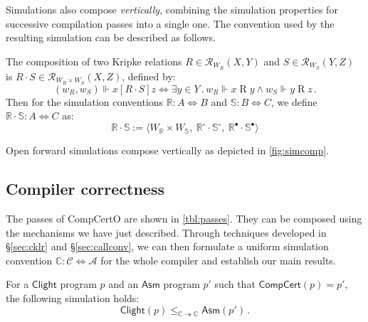 \documentclass[sigplan,screen,review]{acmart}
\newcommand{\kw}[1]{\ensuremath{ \mathsf{#1} }}
\newcommand{\ifr}[1]{\mathrel{[{#1}]}}
\newcommand{\que}{\circ}
\newcommand{\ans}{\bullet}
\begin{document}
Simulations also compose \emph{vertically},
combining the
simulation properties for successive compilation passes
into a single one.
The convention used by the resulting simulation
can be described as follows.

\begin{definition} %
The composition of two Kripke relations
$R \in \mathcal{R}_{W_R}(X, Y)$ and
$S \in \mathcal{R}_{W_S}(Y, Z)$
is %
$R \cdot S \in \mathcal{R}_{W_R \times W_S}(X, Z)$,
defined by:
\[
  (w_R, w_S) \Vdash x \ifr{R \cdot S} z \Leftrightarrow
  \exists y \in Y \,.\,
    w_R \Vdash x \mathrel{R} y \wedge
    w_S \Vdash y \mathrel{R} z \,.
\]
Then for the simulation conventions
$\mathbb{R} : A \Leftrightarrow B$ and
$\mathbb{S} : B \Leftrightarrow C$,
we define
$\mathbb{R} \cdot \mathbb{S} : A \Leftrightarrow C$ as:
\[
  \mathbb{R} \cdot \mathbb{S} :=
  \langle
    W_\mathbb{R} \times W_\mathbb{S}, \:
    \mathbb{R}^\que \cdot \mathbb{S}^\que, \:
    \mathbb{R}^\ans \cdot \mathbb{S}^\ans
  \rangle
\]
\end{definition}

\begin{theorem} \label{thm:fsim-vcomp} %
Open forward simulations compose vertically
as depicted in \autoref{fig:simcomp}.
\end{theorem}



\subsection{Compiler correctness} \label{sec:comppass} %

The passes of CompCertO are shown in \autoref{tbl:passes}.
They can be composed using the mechanisms we have just described.
Through techniques developed in \S\ref{sec:cklr} and \S\ref{sec:callconv},
we can then formulate
a uniform simulation convention
$\mathbb{C} : \mathcal{C} \Leftrightarrow \mathcal{A}$
for the whole compiler
and establish our main results.

\begin{theorem} \label{thm:compc} %
For a \kw{Clight} program $p$
and an \kw{Asm} program $p'$ such that
$\kw{CompCert}(p) = p'$,
the following simulation holds:
\[
    \kw{Clight}(p) \le_{\mathbb{C} \twoheadrightarrow \mathbb{C}}
    \kw{Asm}(p') \,.
\]
\end{theorem}
\end{document}
